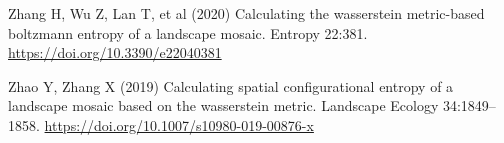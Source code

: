 \documentclass[
  12pt,
  a4paperpaper,
]{article}
\newlength{\cslhangindent}
\newenvironment{CSLReferences}[2] %
 {\begin{list}{}{%
  \setlength{\itemindent}{0pt}
  \setlength{\leftmargin}{0pt}
  \setlength{\parsep}{0pt}
  \ifodd #1
   \setlength{\leftmargin}{\cslhangindent}
   \setlength{\itemindent}{-1\cslhangindent}
  \fi
  \setlength{\itemsep}{#2\baselineskip}}}
 {\end{list}}
\begin{document}
\begin{CSLReferences}{1}{1}
Zhang H, Wu Z, Lan T, et al (2020) Calculating the wasserstein
metric-based boltzmann entropy of a landscape mosaic. Entropy 22:381.
\url{https://doi.org/10.3390/e22040381}

Zhao Y, Zhang X (2019) Calculating spatial configurational entropy of a
landscape mosaic based on the wasserstein metric. Landscape Ecology
34:1849--1858. \url{https://doi.org/10.1007/s10980-019-00876-x}

\end{CSLReferences}
\end{document}
